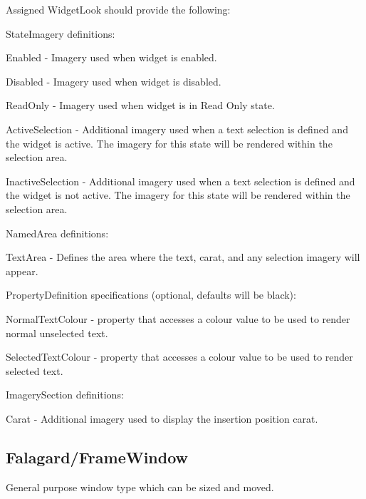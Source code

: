 Assigned Widget\+Look should provide the following\+: 
\begin{DoxyItemize}
\item State\+Imagery definitions\+: 
\begin{DoxyItemize}
\item Enabled -\/ Imagery used when widget is enabled. 
\item Disabled -\/ Imagery used when widget is disabled. 
\item Read\+Only -\/ Imagery used when widget is in \textquotesingle{}Read Only\textquotesingle{} state. 
\item Active\+Selection -\/ Additional imagery used when a text selection is defined and the widget is active. The imagery for this state will be rendered within the selection area. 
\item Inactive\+Selection -\/ Additional imagery used when a text selection is defined and the widget is not active. The imagery for this state will be rendered within the selection area. 
\end{DoxyItemize}


\item Named\+Area definitions\+: 
\begin{DoxyItemize}
\item Text\+Area -\/ Defines the area where the text, carat, and any selection imagery will appear. 
\end{DoxyItemize}


\item Property\+Definition specifications (optional, defaults will be black)\+: 
\begin{DoxyItemize}
\item Normal\+Text\+Colour -\/ property that accesses a colour value to be used to render normal unselected text. 
\item Selected\+Text\+Colour -\/ property that accesses a colour value to be used to render selected text. 
\end{DoxyItemize}


\item Imagery\+Section definitions\+: 
\begin{DoxyItemize}
\item Carat -\/ Additional imagery used to display the insertion position carat. 
\end{DoxyItemize}
\end{DoxyItemize}\hypertarget{fal_wr_ref_fal_wr_ref_sec_4}{}\subsection{Falagard/\+Frame\+Window}\label{fal_wr_ref_fal_wr_ref_sec_4}
General purpose window type which can be sized and moved.

